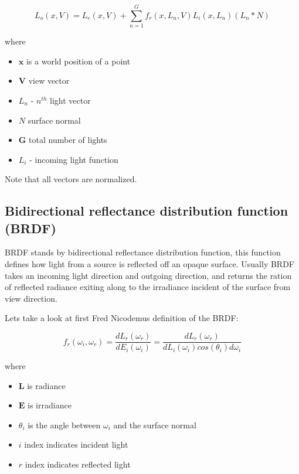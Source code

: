 \documentclass{article}
\begin{document}
\begin{equation}
    L_{o}(x, V) = L_{e}(x, V) + \sum_{n = 1}^{G} f_r(x, L_{n}, V) L_{i}(x, L_{n}) (L_{n} * N)
\end{equation}

where
\begin{itemize}
    \item $\textbf{x}$ is a world position of a point
    \item $\textbf{V}$ view vector
    \item $L_{n}$ - $n^{th}$ light vector
    \item $N$ surface normal
    \item $\textbf{G}$ total number of lights
    \item $L_{i}$ - incoming light function
\end{itemize}

Note that all vectors are normalized.

\subsection{Bidirectional reflectance distribution function (BRDF)}

BRDF stands by bidirectional reflectance distribution function, this function
defines how light from a source is reflected off an opaque surface. Usually BRDF
takes an incoming light direction and outgoing direction, and returns the ration of
reflected radiance exiting along to the irradiance incident of the surface from 
view direction.

Lets take a look at first Fred Nicodemus definition of the BRDF:

\begin{equation}
    f_r(\omega_{i}, \omega_{r}) = \frac{dL_r(\omega_{r})}{dE_i(\omega_{i})} = \frac{dL_r(\omega_{r})}{dL_i(\omega_{i})cos(\theta_{i})d\omega_{i}}
\end{equation}

where 
\begin{itemize}
    \item $\textbf{L}$ is radiance
    \item $\textbf{E}$ is irradiance
    \item $\theta_{i}$ is the angle between $\omega_{i}$ and the surface normal
    \item $i$ index indicates incident light
    \item $r$ index indicates reflected light
\end{itemize}
\end{document}
